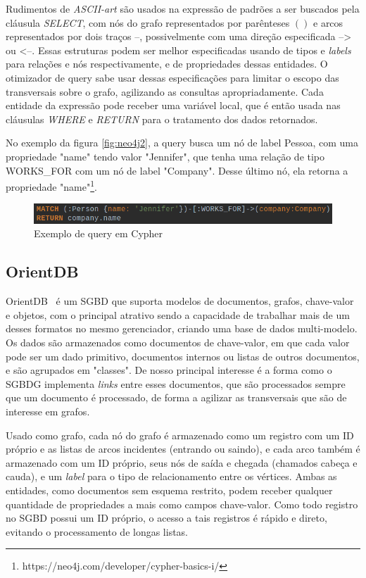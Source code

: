 \documentclass[conference]{IEEEtran}
\begin{document}
Rudimentos de \emph{ASCII-art} são usados na expressão de padrões a ser
buscados pela cláusula \emph{SELECT}, com nós do grafo representados por
parênteses $()$ e arcos representados por dois traços {\ttfamily--},
possivelmente com uma direção especificada {\ttfamily -->} ou {\ttfamily <--}.
Essas estruturas podem ser melhor especificadas usando de tipos e \emph{labels}
para relações e nós respectivamente, e de propriedades dessas entidades. O
otimizador de query sabe usar dessas especificações para limitar o escopo das
transversais sobre o grafo, agilizando as consultas apropriadamente. Cada
entidade da expressão pode receber uma variável local, que é então usada nas
cláusulas \emph{WHERE} e \emph{RETURN} para o tratamento dos dados retornados.

No exemplo da figura \ref{fig:neo4j2}, a query busca um nó de label Pessoa,
com uma propriedade "name" tendo valor "Jennifer", que tenha uma relação de
tipo WORKS\_FOR com um nó de label "Company". Desse último nó, ela retorna a
propriedade "name"\footnote{https://neo4j.com/developer/cypher-basics-i/}.

\begin{figure}[htbp]
\centerline{\includegraphics[width=0.9\linewidth]{neo4j/neo4j_ps2.png}}
\caption{Exemplo de query em Cypher}\label{fig:neo4j2}
\label{fig}
\end{figure}

\subsection{OrientDB}

OrientDB~\cite{orientdb} é um SGBD que suporta modelos de documentos, grafos,
chave-valor e objetos, com o principal atrativo sendo a capacidade de trabalhar
mais de um desses formatos no mesmo gerenciador, criando uma base de dados
multi-modelo. Os dados são armazenados como documentos de chave-valor, em que
cada valor pode ser um dado primitivo, documentos internos ou listas de outros
documentos, e são agrupados em "classes". De nosso principal interesse é a
forma como o SGBDG implementa \emph{links} entre esses documentos, que são
processados sempre que um documento é processado, de forma a agilizar as
transversais que são de interesse em grafos.

Usado como grafo, cada nó do grafo é armazenado como um registro com um ID
próprio e as listas de arcos incidentes (entrando ou saindo), e cada arco
também é armazenado com um ID próprio, seus nós de saída e chegada (chamados
cabeça e cauda), e um \emph{label} para o tipo de relacionamento entre os
vértices. Ambas as entidades, como documentos sem esquema restrito, podem
receber qualquer quantidade de propriedades a mais como campos chave-valor.
Como todo registro no SGBD possui um ID próprio, o acesso a tais registros é
rápido e direto, evitando o processamento de longas listas.
\end{document}
